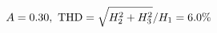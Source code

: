\documentclass[preview]{standalone}
\begin{document}
\begin{align*}
\special{dvisvgm:raw <g id='unique000'>}A=0.30,\ \text{THD}=\sqrt{H_2^2+H_3^2}/H_1=6.0\%\special{dvisvgm:raw </g>}
\end{align*}
\end{document}
